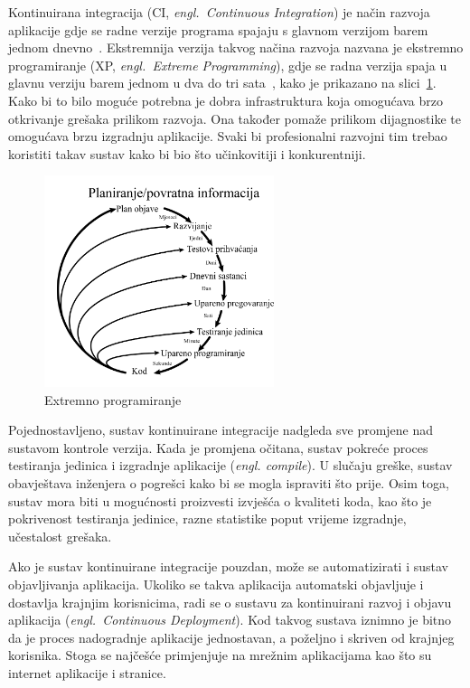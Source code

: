 Kontinuirana integracija (CI, \textit{engl.~Continuous Integration}) je način razvoja aplikacije
gdje se radne verzije programa spajaju s glavnom verzijom barem jednom
dnevno~\citep{fowler2006continuous}. Ekstremnija verzija takvog načina razvoja nazvana je ekstremno
programiranje (XP, \textit{engl.~Extreme Programming}), gdje se radna verzija spaja u glavnu verziju
barem jednom u dva do tri sata~\citep{beck1999embracing}, kako je prikazano na slici~\ref{fig:02xp}.
Kako bi to bilo moguće potrebna je dobra infrastruktura koja omogućava brzo otkrivanje grešaka
prilikom razvoja. Ona također pomaže prilikom dijagnostike te omogućava brzu izgradnju aplikacije.
Svaki bi profesionalni razvojni tim trebao koristiti takav sustav kako bi bio što učinkovitiji i
konkurentniji.

\begin{figure}[h]
    \centering
    \includegraphics[width=0.6\textwidth]{img/02/xp.png}
    \caption{Extremno programiranje}
    \label{fig:02xp}
\end{figure}

Pojednostavljeno, sustav kontinuirane integracije nadgleda sve promjene nad sustavom kontrole
verzija. Kada je promjena očitana, sustav pokreće proces testiranja jedinica i izgradnje aplikacije
(\textit{engl. compile}). U slučaju greške, sustav obavještava inženjera o pogrešci kako bi se mogla
ispraviti što prije. Osim toga, sustav mora biti u mogućnosti proizvesti izvješća o kvaliteti koda,
kao što je pokrivenost testiranja jedinice, razne statistike poput vrijeme izgradnje, učestalost
grešaka.

Ako je sustav kontinuirane integracije pouzdan, može se automatizirati i sustav objavljivanja
aplikacija. Ukoliko se takva aplikacija automatski objavljuje i dostavlja krajnjim korisnicima, radi
se o sustavu za kontinuirani razvoj i objavu aplikacija (\textit{engl.~Continuous Deployment}). Kod
takvog sustava iznimno je bitno da je proces nadogradnje aplikacije jednostavan, a poželjno i
skriven od krajnjeg korisnika. Stoga se najčešće primjenjuje na mrežnim aplikacijama kao što su
internet aplikacije i stranice.

